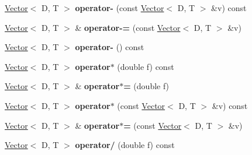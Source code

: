 \begin{DoxyCompactItemize}
\item 
\hypertarget{classutk_1_1Vector_af9a570ccfc436ca299d87c7b85ad88d7}{\hyperlink{classutk_1_1Vector}{Vector}$<$ D, T $>$ {\bfseries operator-\/} (const \hyperlink{classutk_1_1Vector}{Vector}$<$ D, T $>$ \&v) const }\label{classutk_1_1Vector_af9a570ccfc436ca299d87c7b85ad88d7}

\item 
\hypertarget{classutk_1_1Vector_a45d6fb956fcab8d580e4a9700cf344c8}{\hyperlink{classutk_1_1Vector}{Vector}$<$ D, T $>$ \& {\bfseries operator-\/=} (const \hyperlink{classutk_1_1Vector}{Vector}$<$ D, T $>$ \&v)}\label{classutk_1_1Vector_a45d6fb956fcab8d580e4a9700cf344c8}

\item 
\hypertarget{classutk_1_1Vector_ad1e177c46e7db4795f13b702b158cd02}{\hyperlink{classutk_1_1Vector}{Vector}$<$ D, T $>$ {\bfseries operator-\/} () const }\label{classutk_1_1Vector_ad1e177c46e7db4795f13b702b158cd02}

\item 
\hypertarget{classutk_1_1Vector_abfbc8ea9192e67c9ca0e9c6c6585a44e}{\hyperlink{classutk_1_1Vector}{Vector}$<$ D, T $>$ {\bfseries operator$\ast$} (double f) const }\label{classutk_1_1Vector_abfbc8ea9192e67c9ca0e9c6c6585a44e}

\item 
\hypertarget{classutk_1_1Vector_ab7856bb07d25997d8e632914e8fff1d0}{\hyperlink{classutk_1_1Vector}{Vector}$<$ D, T $>$ \& {\bfseries operator$\ast$=} (double f)}\label{classutk_1_1Vector_ab7856bb07d25997d8e632914e8fff1d0}

\item 
\hypertarget{classutk_1_1Vector_afc08f6be481e40fda0dc5b2d797984fc}{\hyperlink{classutk_1_1Vector}{Vector}$<$ D, T $>$ {\bfseries operator$\ast$} (const \hyperlink{classutk_1_1Vector}{Vector}$<$ D, T $>$ \&v) const }\label{classutk_1_1Vector_afc08f6be481e40fda0dc5b2d797984fc}

\item 
\hypertarget{classutk_1_1Vector_af3268322de09c7a1ed580a63beee0506}{\hyperlink{classutk_1_1Vector}{Vector}$<$ D, T $>$ \& {\bfseries operator$\ast$=} (const \hyperlink{classutk_1_1Vector}{Vector}$<$ D, T $>$ \&v)}\label{classutk_1_1Vector_af3268322de09c7a1ed580a63beee0506}

\item 
\hypertarget{classutk_1_1Vector_a07598b25983aa04da007659f4bf33707}{\hyperlink{classutk_1_1Vector}{Vector}$<$ D, T $>$ {\bfseries operator/} (double f) const }\label{classutk_1_1Vector_a07598b25983aa04da007659f4bf33707}


\end{DoxyCompactItemize}
